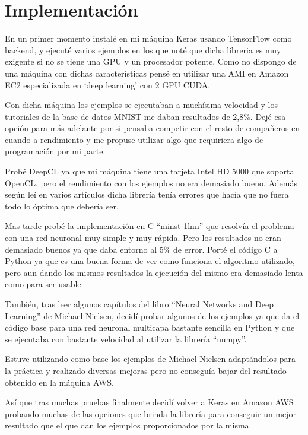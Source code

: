 \chapter{Implementación}

En un primer momento instalé en mi máquina Keras usando TensorFlow como backend, y ejecuté varios ejemplos en los que noté que dicha libreria es muy exigente si no se tiene una GPU y un procesador potente. Como no dispongo de una máquina con dichas características pensé en utilizar una AMI en Amazon EC2 especializada en `deep learning' con 2 GPU CUDA. 

\bigskip
Con dicha máquina los ejemplos se ejecutaban a muchísima velocidad y los tutoriales de la base de datos MNIST me daban resultados de 2,8\%. Dejé esa opción para más adelante por si pensaba competir con el resto de compañeros en cuando a rendimiento y me propuse utilizar algo que requiriera algo de programación por mi parte.

\bigskip
Probé DeepCL ya que mi máquina tiene una tarjeta Intel HD 5000 que soporta OpenCL, pero el rendimiento con los ejemplos no era demasiado bueno. Además según leí en varios artículos dicha librería tenía errores que hacía que no fuera todo lo óptima que debería ser.

\bigskip
Mas tarde probé la implementación en C ``minst-1lnn'' que resolvía el problema con una red neuronal muy simple y muy rápida. Pero los resultados no eran demasiado buenos ya que daba entorno al 5\% de error. Porté el código C a Python ya que es una buena forma de ver como funciona el algoritmo utilizado, pero aun dando los mismos resultados la ejecución del mismo era demasiado lenta como para ser usable.

\bigskip
También, tras leer algunos capítulos del libro ``Neural Networks and Deep Learning'' de Michael Nielsen, decidí probar algunos de los ejemplos ya que da el código base para una red neuronal multicapa bastante sencilla en Python y que se ejecutaba con bastante velocidad al utilizar la librería ``numpy''. 

\bigskip
Estuve utilizando como base los ejemplos de Michael Nielsen adaptándolos para la práctica y realizado diversas mejoras pero no conseguía bajar del resultado obtenido en la máquina AWS.

\bigskip
Así que tras muchas pruebas finalmente decidí volver a Keras en Amazon AWS probando muchas de las opciones que brinda la librería para conseguir un mejor resultado que el que dan los ejemplos proporcionados por la misma.

